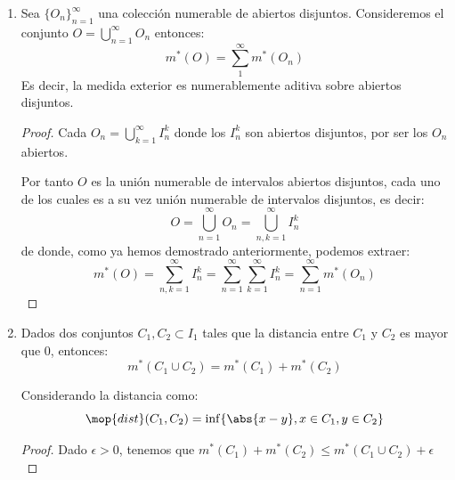 \documentclass{apuntes}
\begin{document}
\begin{enumerate}
\begin{proof}
Tenemos que, lógicamente $O \cup I \smallsetminus O = I$

Por tanto
\[m^*(O)+m^*(I \smallsetminus O) = \abs{I}\]

Sabiendo que $I \smallsetminus K  \subset  \left( I \smallsetminus O \right) \cup \left( O \smallsetminus K \right)$, deducimos:
\[m^*\left(I \smallsetminus K\right) \leq m^*\left(I \smallsetminus O\right) + m^*\left(O \smallsetminus K\right)\]

Si usamos que $m^*\left(K\right) \leq m^*\left(O\right)$, a partir de la desigualdad anterior obtenemos:
\[m^*\left(K\right) + m^*\left(I \smallsetminus K\right) \leq m^*\left(O\right) + m^*\left(I \smallsetminus O\right) + m^*\left(O \smallsetminus K\right) \leq \abs{I} + \epsilon \forall \epsilon\]

\end{proof}

%
\item Sea $\lbrace O_n\rbrace_{n=1}^{\infty}$ una colección numerable de abiertos disjuntos. Consideremos el conjunto $O=\bigcup_{n=1}^{\infty}O_n$ entonces:
\[m^*(O)=\sum_1^{\infty}m^*(O_n)\]
Es decir, la medida exterior es numerablemente aditiva sobre abiertos disjuntos.

\begin{proof}
Cada $O_n=\bigcup_{k=1}^{\infty}I_n^k$ donde los $I_n^k$ son abiertos disjuntos, por ser los $O_n$ abiertos.

Por tanto $O$ es la unión numerable de intervalos abiertos disjuntos, cada uno de los cuales es a su vez unión numerable de intervalos disjuntos, es decir:
\[O= \bigcup_{n=1}^{\infty}O_n = \bigcup_{n,k=1}^{\infty} I_n^k\]
de donde, como ya hemos demostrado anteriormente, podemos extraer:
\[m^*(O)=\sum_{n,k=1}^{\infty}I_n^k = \sum_{n=1}^{\infty}\sum_{k=1}^{\infty}I_n^k=\sum_{n=1}^{\infty} m^*(O_n)\]
\end{proof}

%
\item Dados dos conjuntos $C_1, C_2 \subset I_1$  tales que la distancia entre $C_1$  y $C_2$ es mayor que 0, entonces:
\[m^*(C_1 \cup C_2) = m^*(C_1) + m^*(C_2)\]

Considerando la distancia como:
\[\mop{dist}(C_1, C_2) =  \inf\lbrace \abs{x-y}, x\in C_1, y\in C_2 \rbrace \]

\begin{proof}
Dado $\epsilon > 0$, tenemos que $m^*(C_1) + m^*(C_2) \leq m^*(C_1 \cup C_2) +  \epsilon$


\end{proof}
\end{enumerate}
\end{document}
